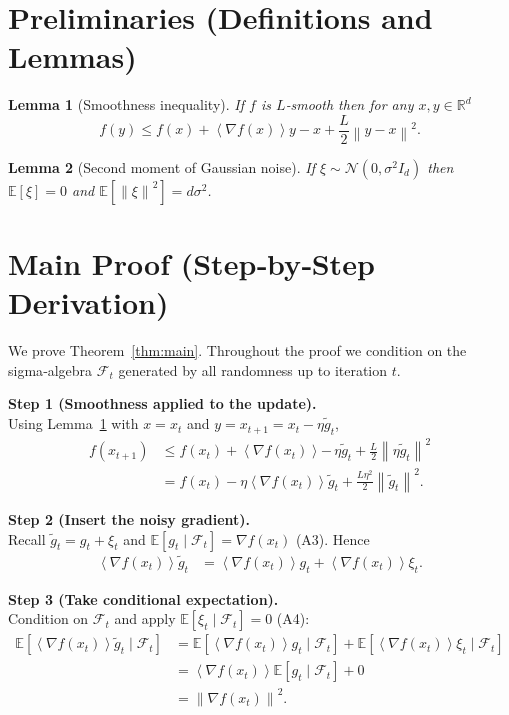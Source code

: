 \documentclass{article}
\newtheorem{lemma}{Lemma}
\newcommand{\EE}{\mathbb{E}}
\newcommand{\RR}{\mathbb{R}}
\newcommand{\norm}[1]{\left\lVert #1 \right\rVert}
\newcommand{\inner}[1]{\left\langle #1 \right\rangle}
\begin{document}
\newpage

\section*{Preliminaries (Definitions and Lemmas)}
\begin{lemma}[Smoothness inequality]\label{lem:smooth}
If $f$ is $L$‑smooth then for any $x,y\in\RR^{d}$
\[
f(y)\le f(x)+\inner{\nabla f(x)}{y-x}+\frac{L}{2}\norm{y-x}^{2}.
\]
\end{lemma}
\begin{lemma}[Second moment of Gaussian noise]\label{lem:gauss}
If $\xi\sim\mathcal{N}(0,\sigma^{2}I_{d})$ then $\EE[\xi]=0$ and
$\EE[\norm{\xi}^{2}]=d\sigma^{2}$.
\end{lemma}

\section*{Main Proof (Step‑by‑Step Derivation)}
We prove Theorem~\ref{thm:main}.  Throughout the proof we condition on the sigma‑algebra
$\mathcal{F}_{t}$ generated by all randomness up to iteration $t$.

\bigskip
\noindent\textbf{Step 1 (Smoothness applied to the update).}\\
Using Lemma~\ref{lem:smooth} with $x=x_{t}$ and $y=x_{t+1}=x_{t}-\eta\tilde{g}_{t}$,
\begin{align}
f(x_{t+1})
&\le f(x_{t})+\inner{\nabla f(x_{t})}{-\,\eta\tilde{g}_{t}}
      +\frac{L}{2}\norm{\eta\tilde{g}_{t}}^{2} \nonumber\\
&= f(x_{t})-\eta\inner{\nabla f(x_{t})}{\tilde{g}_{t}}
   +\frac{L\eta^{2}}{2}\norm{\tilde{g}_{t}}^{2}. \tag{Step 1}
\end{align}

\noindent\textbf{Step 2 (Insert the noisy gradient).}\\
Recall $\tilde{g}_{t}=g_{t}+\xi_{t}$ and $\EE[g_{t}\mid\mathcal{F}_{t}]=\nabla f(x_{t})$ (A3).
Hence
\begin{align}
\inner{\nabla f(x_{t})}{\tilde{g}_{t}}
&=\inner{\nabla f(x_{t})}{g_{t}}+\inner{\nabla f(x_{t})}{\xi_{t}}. \tag{Step 2}
\end{align}

\noindent\textbf{Step 3 (Take conditional expectation).}\\
Condition on $\mathcal{F}_{t}$ and apply $\EE[\xi_{t}\mid\mathcal{F}_{t}]=0$ (A4):
\begin{align}
\EE\!\left[\inner{\nabla f(x_{t})}{\tilde{g}_{t}}\mid\mathcal{F}_{t}\right]
&=\EE\!\left[\inner{\nabla f(x_{t})}{g_{t}}\mid\mathcal{F}_{t}\right]
   +\EE\!\left[\inner{\nabla f(x_{t})}{\xi_{t}}\mid\mathcal{F}_{t}\right]\nonumber\\
&=\inner{\nabla f(x_{t})}{\EE[g_{t}\mid\mathcal{F}_{t}]}
   +0 \nonumber\\
&=\norm{\nabla f(x_{t})}^{2}. \tag{Step 3}
\end{align}
\end{document}
